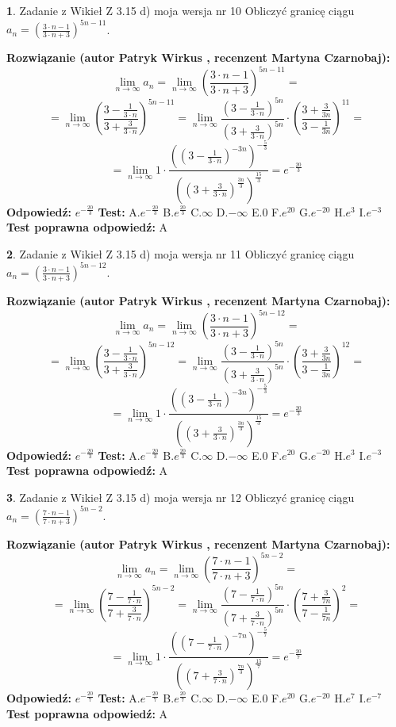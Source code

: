\documentclass[12pt, a4paper]{article}
\theoremstyle{definition} %
\newtheorem{zad}{}
\newcommand{\zadStart}[1]{\begin{zad}#1\newline}
\newcommand{\zadStop}{\end{zad}}
\newcommand{\rozwStart}[2]{\noindent \textbf{Rozwiązanie (autor #1 , recenzent #2): }\newline}
\newcommand{\rozwStop}{\newline}
\newcommand{\odpStart}{\noindent \textbf{Odpowiedź:}\newline}
\newcommand{\odpStop}{\newline}
\newcommand{\testStart}{\noindent \textbf{Test:}\newline}
\newcommand{\testStop}{\newline}
\newcommand{\kluczStart}{\noindent \textbf{Test poprawna odpowiedź:}\newline}
\newcommand{\kluczStop}{\newline}
\begin{document}
\zadStart{Zadanie z Wikieł Z 3.15 d) moja wersja nr 10}
Obliczyć granicę ciągu $a_{n}=(\frac{3\cdot n - 1}{3 \cdot n + 3})^{5n-11}$.
\zadStop
\rozwStart{Patryk Wirkus}{Martyna Czarnobaj}
$$\lim\limits_{n\to\infty} a_{n} = \lim\limits_{n\to\infty}(\frac{3\cdot n - 1}{3 \cdot n + 3})^{5n-11}=$$
$$=\lim\limits_{n\to\infty}(\frac{3 - \frac{1}{3\cdot n}}{3 + \frac{3}{3 \cdot n}})^{5n-11}=\lim\limits_{n\to\infty}\frac{(3 - \frac{1}{3\cdot n})^{5n}}{(3 + \frac{3}{3\cdot n})^{5n}} \cdot (\frac{3+\frac{3}{3n}}{3-\frac{1}{3n}})^{11}=$$
$$=\lim\limits_{n\to\infty} 1 \cdot \frac{((3-\frac{1}{3 \cdot n})^{-3n})^{-\frac{5}{3}}}{((3+\frac{3}{3 \cdot n})^{\frac{3n}{3}})^{\frac{15}{3}}} =e^{-\frac{20}{3}}$$
\rozwStop
\odpStart
$e^{-\frac{20}{3}}$
\odpStop
\testStart
A.$ e^{-\frac{20}{3}}$
B.$ e^{\frac{20}{3}}$
C.$\infty$
D.$-\infty$
E.$0$
F.$e^{20}$
G.$e^{-20}$
H.$e^{3}$
I.$e^{-3}$
\testStop
\kluczStart
A
\kluczStop



\zadStart{Zadanie z Wikieł Z 3.15 d) moja wersja nr 11}
Obliczyć granicę ciągu $a_{n}=(\frac{3\cdot n - 1}{3 \cdot n + 3})^{5n-12}$.
\zadStop
\rozwStart{Patryk Wirkus}{Martyna Czarnobaj}
$$\lim\limits_{n\to\infty} a_{n} = \lim\limits_{n\to\infty}(\frac{3\cdot n - 1}{3 \cdot n + 3})^{5n-12}=$$
$$=\lim\limits_{n\to\infty}(\frac{3 - \frac{1}{3\cdot n}}{3 + \frac{3}{3 \cdot n}})^{5n-12}=\lim\limits_{n\to\infty}\frac{(3 - \frac{1}{3\cdot n})^{5n}}{(3 + \frac{3}{3\cdot n})^{5n}} \cdot (\frac{3+\frac{3}{3n}}{3-\frac{1}{3n}})^{12}=$$
$$=\lim\limits_{n\to\infty} 1 \cdot \frac{((3-\frac{1}{3 \cdot n})^{-3n})^{-\frac{5}{3}}}{((3+\frac{3}{3 \cdot n})^{\frac{3n}{3}})^{\frac{15}{3}}} =e^{-\frac{20}{3}}$$
\rozwStop
\odpStart
$e^{-\frac{20}{3}}$
\odpStop
\testStart
A.$ e^{-\frac{20}{3}}$
B.$ e^{\frac{20}{3}}$
C.$\infty$
D.$-\infty$
E.$0$
F.$e^{20}$
G.$e^{-20}$
H.$e^{3}$
I.$e^{-3}$
\testStop
\kluczStart
A
\kluczStop



\zadStart{Zadanie z Wikieł Z 3.15 d) moja wersja nr 12}
Obliczyć granicę ciągu $a_{n}=(\frac{7\cdot n - 1}{7 \cdot n + 3})^{5n-2}$.
\zadStop
\rozwStart{Patryk Wirkus}{Martyna Czarnobaj}
$$\lim\limits_{n\to\infty} a_{n} = \lim\limits_{n\to\infty}(\frac{7\cdot n - 1}{7 \cdot n + 3})^{5n-2}=$$
$$=\lim\limits_{n\to\infty}(\frac{7 - \frac{1}{7\cdot n}}{7 + \frac{3}{7 \cdot n}})^{5n-2}=\lim\limits_{n\to\infty}\frac{(7 - \frac{1}{7\cdot n})^{5n}}{(7 + \frac{3}{7\cdot n})^{5n}} \cdot (\frac{7+\frac{3}{7n}}{7-\frac{1}{7n}})^{2}=$$
$$=\lim\limits_{n\to\infty} 1 \cdot \frac{((7-\frac{1}{7 \cdot n})^{-7n})^{-\frac{5}{7}}}{((7+\frac{3}{7 \cdot n})^{\frac{7n}{3}})^{\frac{15}{7}}} =e^{-\frac{20}{7}}$$
\rozwStop
\odpStart
$e^{-\frac{20}{7}}$
\odpStop
\testStart
A.$ e^{-\frac{20}{7}}$
B.$ e^{\frac{20}{7}}$
C.$\infty$
D.$-\infty$
E.$0$
F.$e^{20}$
G.$e^{-20}$
H.$e^{7}$
I.$e^{-7}$
\testStop
\kluczStart
A
\kluczStop
\end{document}
